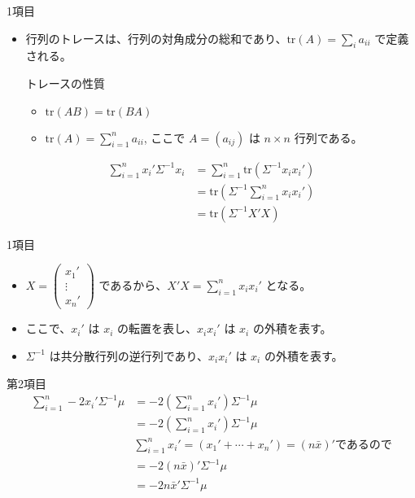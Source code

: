 \documentclass[aspectratio=169]{beamer}
\begin{document}
\begin{CJK}{UTF8}{min}
\begin{frame}{1項目}
    \begin{itemize}
        \item 行列のトレースは、行列の対角成分の総和であり、$\text{tr}(A) = \sum_{i} a_{ii}$ で定義される。     \begin{block}{トレースの性質}
            \begin{itemize}
                \item $\text{tr}(AB) = \text{tr}(BA)$
                \item $\text{tr}(A) = \sum_{i=1}^{n} a_{ii}$, ここで $A = (a_{ij})$ は $n \times n$ 行列である。
            \end{itemize}
        \end{block}
    \end{itemize}
    \begin{align*}
    \sum_{i=1}^n x_i'\Sigma^{-1}x_i &= \sum_{i=1}^n \text{tr}\left(\Sigma^{-1} x_i x_i'\right) \\
    &= \text{tr}\left(\Sigma^{-1} \sum_{i=1}^n x_i x_i'\right) \\
    &= \text{tr}(\Sigma^{-1} X'X)
    \end{align*}
\end{frame}
\begin{frame}{1項目}
    \begin{itemize}
        \item $X=\begin{pmatrix}x_1' \\ \vdots \\ x_n'\end{pmatrix}$ であるから、$X'X = \sum_{i=1}^n x_ix_i'$ となる。
        \item ここで、$x_i'$ は $x_i$ の転置を表し、$x_ix_i'$ は $x_i$ の外積を表す。
        \item $\Sigma^{-1}$ は共分散行列の逆行列であり、$x_ix_i'$ は $x_i$ の外積を表す。        
    \end{itemize}
\end{frame}
\begin{frame}{第2項目}
    \begin{align*}
    \sum_{i=1}^n -2x_i'\Sigma^{-1}\mu 
    &= -2(\sum_{i=1}^n x_i') \Sigma^{-1} \mu \\
    &= -2\left(\sum_{i=1}^n x_i'\right) \Sigma^{-1} \mu \\
    &\sum_{i=1}^n x_i' =  (x_1' + \cdots + x_n') = (n\bar{x})'\text{であるので} \\
    &= -2 (n\bar{x})' \Sigma^{-1} \mu \\
    &= -2 n\bar{x}' \Sigma^{-1} \mu \\
    \end{align*}
\end{frame}


\end{CJK}
\end{document}
